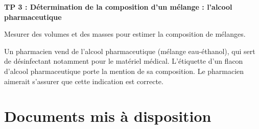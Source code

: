 
\renewcommand{\thesubsection}{\textcolor{red}{\Roman{section}.\arabic{subsection}}}
\renewcommand{\thesubsubsection}{\textcolor{red}{\Roman{section}.\arabic{subsection}.\alph{subsubsection}}}

\setcounter{section}{0}
\setcounter{document}{0}
\sndEnTeteTPTrois

\begin{center}
\begin{mdframed}[style=titr, leftmargin=60pt, rightmargin=60pt, innertopmargin=7pt, innerbottommargin=7pt, innerrightmargin=8pt, innerleftmargin=8pt]

\begin{center}
\large{\textbf{TP 3 : Détermination de la composition d'un mélange : l'alcool pharmaceutique}}
\end{center}

\end{mdframed}
\end{center}



\begin{tcolorbox}[colback=blue!5!white,colframe=blue!75!black,title=Objectifs de la séance :]
Mesurer des volumes et des masses pour estimer la composition de mélanges.
\end{tcolorbox}

\begin{tcolorbox}[colback=orange!5!white,colframe=orange!75!black,title= Scénario:]
Un pharmacien vend de l’alcool pharmaceutique (mélange eau-éthanol), qui sert de désinfectant notamment pour le matériel médical. L’étiquette d’un flacon d’alcool pharmaceutique porte la mention de sa composition. Le pharmacien aimerait s’assurer que cette indication est correcte.
\end{tcolorbox}

\section{Documents mis à disposition}

